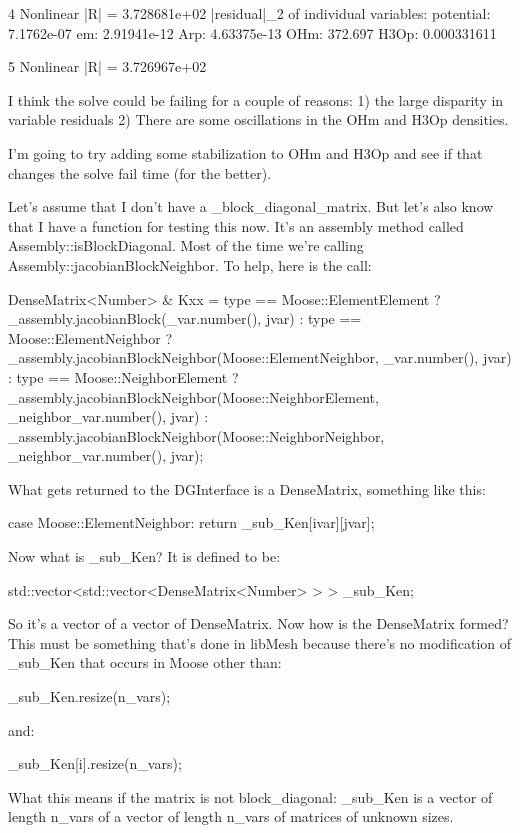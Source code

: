 { 4 Nonlinear |R| = 3.728681e+02
    |residual|_2 of individual variables:
                  potential: 7.1762e-07
                  em:        2.91941e-12
                  Arp:       4.63375e-13
                  OHm:       372.697
                  H3Op:      0.000331611

 5 Nonlinear |R| = 3.726967e+02

I think the solve could be failing for a couple of reasons: 1) the large disparity in variable residuals 2) There are some oscillations in the OHm and H3Op densities.

I'm going to try adding some stabilization to OHm and H3Op and see if that changes the solve fail time (for the better).

Let's assume that I don't have a _block_diagonal_matrix. But let's also know that I have a function for testing this now. It's an assembly method called Assembly::isBlockDiagonal. Most of the time we're calling Assembly::jacobianBlockNeighbor. To help, here is the call:

 DenseMatrix<Number> & Kxx = type == Moose::ElementElement ? _assembly.jacobianBlock(_var.number(), jvar) :
                              type == Moose::ElementNeighbor ? _assembly.jacobianBlockNeighbor(Moose::ElementNeighbor, _var.number(), jvar) :
                              type == Moose::NeighborElement ? _assembly.jacobianBlockNeighbor(Moose::NeighborElement, _neighbor_var.number(), jvar) :
                              _assembly.jacobianBlockNeighbor(Moose::NeighborNeighbor, _neighbor_var.number(), jvar);

What gets returned to the DGInterface is a DenseMatrix, something like this:

    case Moose::ElementNeighbor: return _sub_Ken[ivar][jvar];

Now what is _sub_Ken? It is defined to be:

  std::vector<std::vector<DenseMatrix<Number> > > _sub_Ken;

So it's a vector of a vector of DenseMatrix. Now how is the DenseMatrix formed? This must be something that's done in libMesh because there's no modification of _sub_Ken that occurs in Moose other than:

  _sub_Ken.resize(n_vars);

and:

      _sub_Ken[i].resize(n_vars);

What this means if the matrix is not block_diagonal: _sub_Ken is a vector of length n_vars of a vector of length n_vars of matrices of unknown sizes.

}
